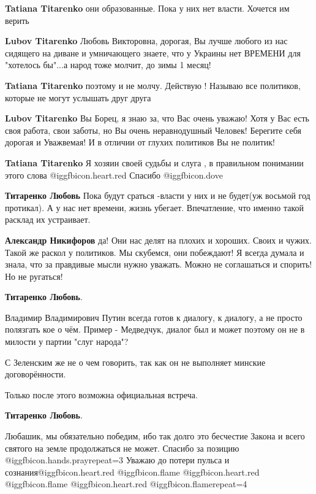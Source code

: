 \begin{itemize}
\begin{itemize} %
\textbf{Tatiana Titarenko} они образованные. Пока у них нет власти. Хочется им верить

\textbf{Lubov Titarenko} Любовь Викторовна, дорогая, Вы лучше любого из нас сидящего на диване и умничающего знаете, что у Украины нет ВРЕМЕНИ для "хотелось бы"...а народ тоже молчит, до зимы 1 месяц!

\textbf{Tatiana Titarenko} поэтому и не молчу. Действую ! Называю все политиков, которые не могут услышать друг друга

\textbf{Lubov Titarenko} Вы Борец, я знаю за, что Вас очень уважаю! Хотя у Вас есть своя работа, свои заботы, но Вы очень неравнодушный Человек! Берегите себя дорогая и Уважвемая! И в отличии от глухих политиков Вы не политик!

\textbf{Tatiana Titarenko} Я хозяин своей судьбы и слуга , в правильном понимании этого слова @igg{fbicon.heart.red} 
Спасибо @igg{fbicon.dove} 

\textbf{Титаренко Любовь} Пока будут сраться -власти у них и не будет(уж восьмой год протикал).
А у нас нет времени, жизнь убегает. Впечатление, что именно такой расклад их устраивает.

\textbf{Александр Никифоров} да! Они нас делят на плохих и хороших. Своих и чужих.
Такой же раскол у политиков.
Мы скубемся, они побеждают!
Я всегда думала и знала, что за правдивые мысли нужно уважать. Можно не соглашаться и спорить! Но не ругаться!

\textbf{Титаренко Любовь}.

Владимир Владимирович Путин всегда готов к диалогу, к диалогу, а не просто
полязгать кое о чём. Пример - Медведчук, диалог был и может поэтому он не в
милости у партии "слуг народа"?

С Зеленским же не о чем говорить, так как он не выполняет минские
договорённости.

Только после этого возможна официальная встреча.

\end{itemize} %

\textbf{Титаренко Любовь}. 

Любашик, мы обязательно победим, ибо так долго это бесчестие Закона и всего
святого на земле продолжаться не может. Спасибо за позицию @igg{fbicon.hands.pray}{repeat=3}  Уважаю
до потери пульса и сознания@igg{fbicon.heart.red} @igg{fbicon.flame} @igg{fbicon.heart.red} @igg{fbicon.flame} @igg{fbicon.heart.red} @igg{fbicon.flame}{repeat=4} 


\end{itemize}
